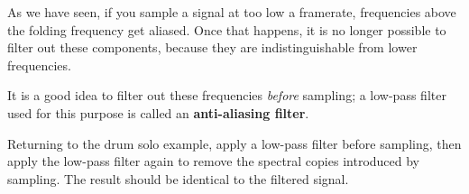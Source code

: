 \documentclass[12pt]{book}
\begin{document}
\begin{exercise}
As we have seen, if you sample a signal at too low a
framerate, frequencies above the folding frequency get aliased.
Once that happens, it is no longer possible to filter out
these components, because they are indistinguishable from
lower frequencies.

It is a good idea to filter out these frequencies {\em before}
sampling; a low-pass filter used for this purpose is called
an {\bf anti-aliasing filter}.

Returning to the drum solo example, apply a low-pass filter
before sampling, then apply the low-pass filter again to remove
the spectral copies introduced by sampling.  The result should
be identical to the filtered signal.
\end{exercise}


\backmatter
\printindex
\end{document}
